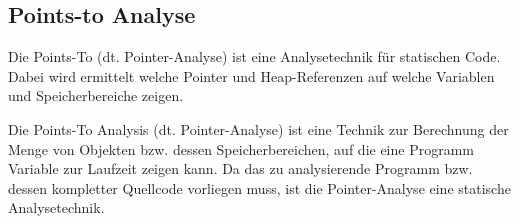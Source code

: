 \subsection{Points-to Analyse}
\label{subsec:pointsto}
Die Points-To (dt. Pointer-Analyse) ist eine Analysetechnik für statischen Code. Dabei wird ermittelt welche Pointer und Heap-Referenzen auf welche Variablen und Speicherbereiche zeigen.

Die Points-To Analysis (dt. Pointer-Analyse) ist eine Technik zur Berechnung der Menge von Objekten bzw. dessen Speicherbereichen, auf die eine Programm Variable zur Laufzeit zeigen kann\cite{Hind2001, Smaragdakis2015}. Da das zu analysierende Programm bzw. dessen kompletter Quellcode vorliegen muss, ist die Pointer-Analyse eine statische Analysetechnik.
